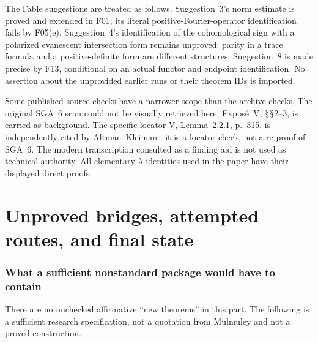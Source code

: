 \documentclass[11pt,a4paper]{article}
\renewcommand{\S}{\ensuremath{\mathsection}}
\newcommand{\fid}[1]{\textsf{#1}}\newcommand{\gate}[1]{\textsf{#1}}
\theoremstyle{named}\newtheorem{finding}{Finding}[section]
\theoremstyle{definition}\newtheorem{definition}[finding]{Definition}
\theoremstyle{remark}\newtheorem{remark}[finding]{Remark}
\begin{document}
The Fable suggestions are treated as follows. Suggestion~3's norm estimate is proved and extended in \fid{F01}; its literal positive-Fourier-operator identification fails by \fid{F05}(e). Suggestion~4's identification of the cohomological sign with a polarized evanescent intersection form remains unproved: parity in a trace formula and a positive-definite form are different structures. Suggestion~8 is made precise by \fid{F13}, conditional on an actual functor and endpoint identification. No assertion about the unprovided earlier runs or their theorem IDs is imported.

Some published-source checks have a narrower scope than the archive checks. The original SGA~6 scan could not be visually retrieved here; Expos\'e~V, \S\S2--3, is carried as background. The specific locator V, Lemma~2.2.1, p.~315, is independently cited by Altman--Kleiman \cite[\S2.10]{AK}; it is a locator check, not a re-proof of SGA~6. The modern transcription consulted as a finding aid is not used as technical authority. All elementary $\lambda$ identities used in the paper have their displayed direct proofs.

\part{Unproved bridges, attempted routes, and final state}
\section{What a sufficient nonstandard package would have to contain}\label{sec:gates}
There are no unchecked affirmative ``new theorems'' in this part. The following is a sufficient research specification, not a quotation from Mulmuley and not a proved construction.
\end{document}
